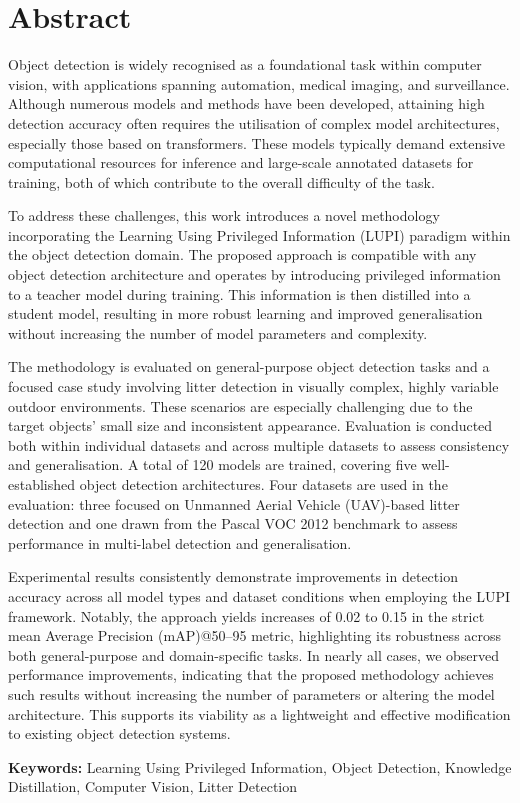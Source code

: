 \chapter*{Abstract}

Object detection is widely recognised as a foundational task within computer vision, with applications spanning automation, medical imaging, and surveillance. Although numerous models and methods have been developed, attaining high detection accuracy often requires the utilisation of complex model architectures, especially those based on transformers. These models typically demand extensive computational resources for inference and large-scale annotated datasets for training, both of which contribute to the overall difficulty of the task.

To address these challenges, this work introduces a novel methodology incorporating the Learning Using Privileged Information (LUPI) paradigm within the object detection domain. The proposed approach is compatible with any object detection architecture and operates by introducing privileged information to a teacher model during training. This information is then distilled into a student model, resulting in more robust learning and improved generalisation without increasing the number of model parameters and complexity.

The methodology is evaluated on general-purpose object detection tasks and a focused case study involving litter detection in visually complex, highly variable outdoor environments. These scenarios are especially challenging due to the target objects' small size and inconsistent appearance. Evaluation is conducted both within individual datasets and across multiple datasets to assess consistency and generalisation. A total of 120 models are trained, covering five well-established object detection architectures. Four datasets are used in the evaluation: three focused on Unmanned Aerial Vehicle (UAV)-based litter detection and one drawn from the Pascal VOC 2012 benchmark to assess performance in multi-label detection and generalisation.

Experimental results consistently demonstrate improvements in detection accuracy across all model types and dataset conditions when employing the LUPI framework. Notably, the approach yields increases of 0.02 to 0.15 in the strict mean Average Precision (mAP)@50--95 metric, highlighting its robustness across both general-purpose and domain-specific tasks. In nearly all cases, we observed performance improvements, indicating that the proposed methodology achieves such results without increasing the number of parameters or altering the model architecture. This supports its viability as a lightweight and effective modification to existing object detection systems.

\bigskip\bigskip
\noindent
\textbf{Keywords:} Learning Using Privileged Information, Object Detection, Knowledge Distillation, Computer Vision, Litter Detection